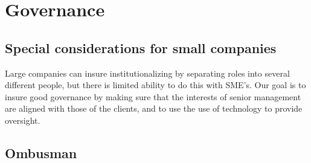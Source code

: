 \chapter{Governance}

\section{Special considerations for small companies}

Large companies can insure institutionalizing by separating roles into
several different people, but there is limited ability to do this with
SME's.  Our goal is to insure good governance by making sure that the
interests of senior management are aligned with those of the clients,
and to use the use of technology to provide oversight.

\section{Ombusman}


